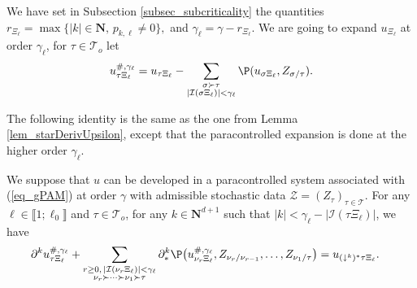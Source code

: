 \documentclass[11pt]{preprint}
\newcommand{\mcI}{\mathcal{I}}
\newcommand{\mcZ}{\mathcal{Z}}
\newcommand{\mcT}{\mathcal{T}}
\def\eqref#1{(\ref{#1})}
\newcommand{\bfN}{\mathbf{N}}
\newcommand{\bbrack}[1]{ \llbracket #1 \rrbracket }
\begin{document}
	We have set in Subsection \ref{subsec_subcriticality} the quantities $r_{\Xi_\ell} =  \max\{ |k|\in\bfN, \, p_{k,\ell}\ne 0   \},$ and  $\gamma_\ell=\gamma-r_{\Xi_\ell}$. We are going to expand $u_{\Xi_\ell}$ at order $\gamma_\ell$, for $\tau\in\mcT_o$ let 
	\begin{equation}\label{eq_udash_gammaell}
		{u}_{\tau\Xi_\ell}^{\#,\gamma_\ell} = {u}_{\tau\Xi_\ell} - \sum_{\substack{\sigma\succ\tau \\ |\mcI(\sigma\Xi_\ell)|<\gamma_\ell}} \P(   u_{\sigma\Xi_\ell} , Z_{\sigma/\tau}  ).
	\end{equation}
	
	
	The following identity is the same as the one from Lemma \ref{lem_starDerivUpsilon}, except that the paracontrolled expansion is done at the higher order $\gamma_\ell$.
	
	\begin{lemma}\label{lem_starDerivUpsilon_hat}
	We suppose that $u$ can be developed in a  paracontrolled system associated with \eqref{eq_gPAM} at order $\gamma$ with admissible stochastic data $\mcZ=(Z_\tau)_{\tau\in\mcT}$. For any $\ell\in\bbrack{1;\ell_0}$ and  $\tau\in\mcT_o$, for any $k\in\bfN^{d+1}$ such that $|k|< \gamma_\ell-|\mcI(\tau\Xi_\ell)|$, we have
	\begin{equation}\label{eq_starPartialUTau_hat} \begin{split}
			&\partial^k u_{\tau\Xi_\ell}^{\#,\gamma_\ell} + \sum_{\substack{r\geq 0, \, |\mcI(\nu_r\Xi_\ell)|<\gamma_\ell \\ \nu_r\succ\dots\succ\nu_1\succ\tau}}\partial^k_*\P\big( u_{\nu_r\Xi_\ell}^{\#,\gamma_\ell}, Z_{\nu_r/\nu_{r-1}},\dots, Z_{\nu_1/\tau}\big) 
			= u_{(\downarrow^k)^* \tau\Xi_\ell}.
	\end{split}\end{equation}
	\end{lemma}
	
\end{document}

